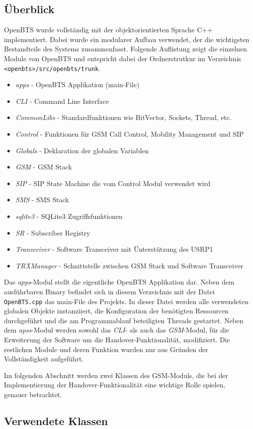 \label{sec:swarch} 

\subsection{Überblick}

OpenBTS wurde vollständig mit der objektorientierten Sprache C++ implementiert. Dabei wurde ein modularer Aufbau verwendet, der die wichtigsten Bestandteile des Systems zusammenfasst. Folgende Auflistung zeigt die einzelnen Module von OpenBTS und entspricht dabei der Ordnerstrutkur im Verzeichnis \lstinline{<openbts>/src/openbts/trunk}.

\begin{itemize}
 \item \textit{apps} - OpenBTS Applikation (main-File)
 \item \textit{CLI} - Command Line Interface
 \item \textit{CommonLibs} - Standardfunktionen wie BitVector, Sockets, Thread, etc.
 \item \textit{Control} - Funktionen für GSM Call Control, Mobility Management und SIP
 \item \textit{Globals} - Deklaration der globalen Variablen
 \item \textit{GSM} - GSM Stack
 \item \textit{SIP} - SIP State Machine die vom Control Modul verwendet wird
 \item \textit{SMS} - SMS Stack
 \item \textit{sqlite3} - SQLite3 Zugriffsfunktionen
 \item \textit{SR} - Subscriber Registry
 \item \textit{Transceiver} - Software Transceiver mit Ünterstützung des USRP1
 \item \textit{TRXManager} - Schnittstelle zwischen GSM Stack und Software Transceiver
\end{itemize}

Das \textit{apps}-Modul stellt die eigentliche OpenBTS Applikation dar. Neben dem ausführbaren Binary befindet sich in diesem Verzeichnis mit der Datei \lstinline{OpenBTS.cpp} das main-File des Projekts. In dieser Datei werden alle verwendeten globalen Objekte instanziiert, die Konfiguration der benötigten Ressourcen durchgeführt und die am Programmablauf beteiligten Threads gestartet. Neben dem \textit{apss}-Modul werden sowohl das \textit{CLI}- als auch das \textit{GSM}-Modul, für die Erweiterung der Software um die Handover-Funktionalität, modifiziert. Die restlichen Module und deren Funktion wurden nur aus Gründen der Vollständigkeit aufgeführt.

Im folgenden Abschnitt werden zwei Klassen des GSM-Moduls, die bei der Implementierung der Handover-Funktionalität eine wichtige Rolle spielen, genauer betrachtet.

\subsection{Verwendete Klassen}


